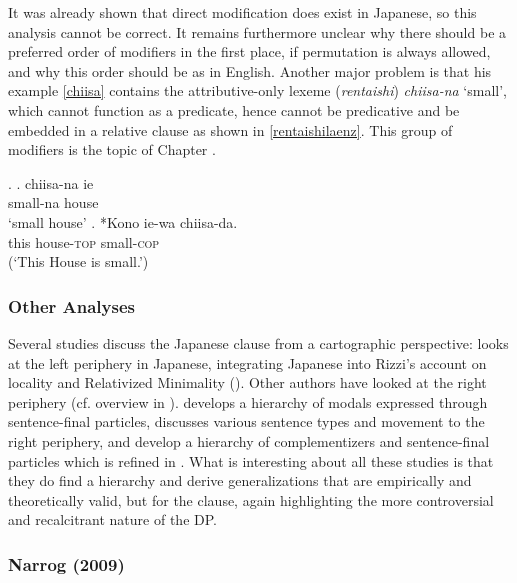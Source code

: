 \documentclass [output=book,colorlinks,citecolor=brown]{langscibook}
\begin{document}
It was already shown that direct modification does exist in Japanese, so this analysis cannot be correct. It remains furthermore unclear why there should be a preferred order of modifiers in the first place, if permutation is always allowed, and why this order should be as in English. Another major problem is that his example \ref{chiisa} contains the attributive-only lexeme (\textit{rentaishi}) \textit{chiisa-na} `small’, which cannot function as a predicate, hence cannot be predicative and be embedded in a relative clause as shown in \ref{rentaishilaenz}. This group of modifiers is the topic of Chapter .

\ex. \label{rentaishilaenz} \ag. chiisa-na ie\\
small-na house\\
`small house'
\bg. *Kono ie-wa chiisa-da.\\
this house-\textsc{top} small-\textsc{cop}\\
(`This House is small.’)

\subsubsection{Other Analyses}

Several studies discuss the Japanese clause from a cartographic perspective: \citet{endo:2007:locality} looks at the left periphery in Japanese, integrating Japanese into Rizzi's account on locality and Relativized Minimality (\citeyear{rizzi:1997:the}). Other authors have looked at the right periphery (cf. overview in \citealt{saito:2015:carto}). \citet{ueda:2008:person} develops a hierarchy of modals expressed through sentence-final particles, \citet{saito:2013:sentence} discusses various sentence types and movement to the right periphery, and \citet{saito:2012:deriving} develop a hierarchy of complementizers and sentence-final particles which is refined in \citet{saito:2015:carto}. What is interesting about all these studies is that they do find a hierarchy and derive generalizations that are empirically and theoretically valid, but for the clause, again highlighting the more controversial and recalcitrant nature of the DP.

\subsubsection{Narrog (2009)} \label{narrog}
\end{document}
